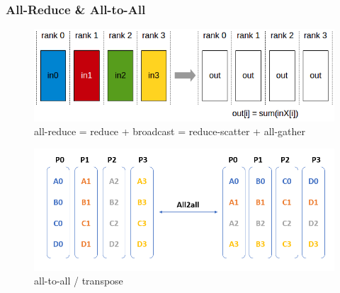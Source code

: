 \documentclass{beamer}
\begin{document}
\begin{frame}[fragile]
\frametitle{All-Reduce \& All-to-All}

\begin{figure}[h]
    \centering
    \includegraphics[height=0.3\textheight]{allreduce.png}
    \captionsetup{labelformat=empty}
    \caption{all-reduce = reduce + broadcast = reduce-scatter + all-gather}
\end{figure}

\begin{figure}[h]
    \centering
    \includegraphics[height=0.35\textheight]{all2all.png}
    \captionsetup{labelformat=empty}
    \caption{all-to-all / transpose}
\end{figure}

\end{frame}
\end{document}
